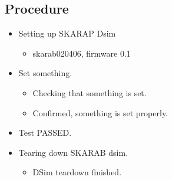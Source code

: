 \documentclass{article}%
\begin{document}
\subsection{Procedure}%
\label{subsec:Procedure}%
\begin{itemize}%
\item%
Setting up SKARAP Dsim%
\begin{itemize}%
\item%
skarab020406, firmware 0.1%
\end{itemize}%
\item%
Set something.%
\begin{itemize}%
\item%
Checking that something is set.%
\item%
Confirmed, something is set properly.%
\end{itemize}%
\item%
Test PASSED.%
%
\item%
Tearing down SKARAB dsim.%
\begin{itemize}%
\item%
DSim teardown finished.%
\end{itemize}%
\end{itemize}

%
\end{document}
